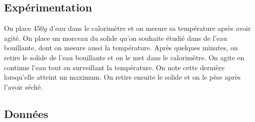 \documentclass[12pt]{article}
\begin{document}
\subsection{Expérimentation}
On place $450g$ d'eau dans le calorimètre et on mesure sa température après avoir agité. On place un morceau du solide qu'on souhaite étudié dans de l'eau bouillante, dont on mesure aussi la température. Après quelques minutes, on retire le solide de l'eau bouillante et on le met dans le calorimètre. On agite en continue l'eau tout en surveillant la température. On note cette dernière lorsqu'elle atteint un maximum. On retire ensuite le solide et on le pèse après l'avoir séché.

\subsection{Données}
\end{document}
